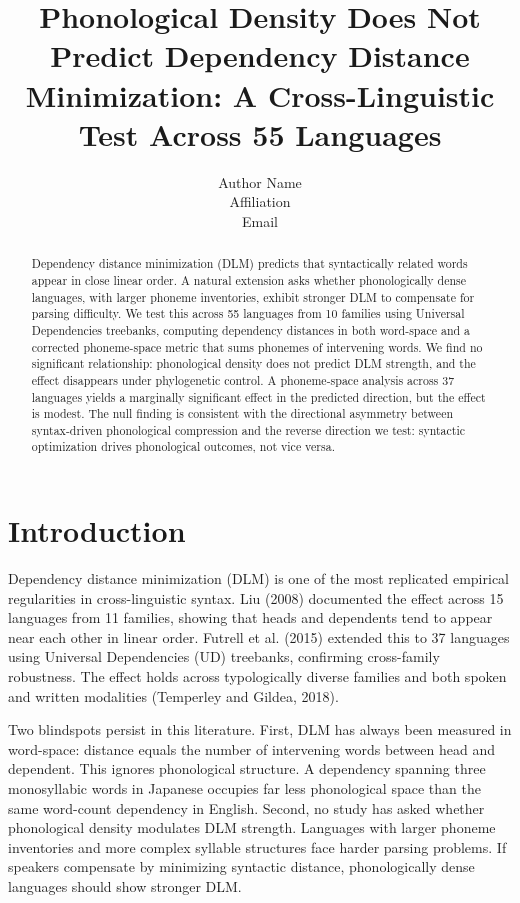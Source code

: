 \documentclass[11pt,letterpaper]{article}
\begin{document}
\title{Phonological Density Does Not Predict Dependency Distance Minimization: A Cross-Linguistic Test Across 55 Languages}

\author{Author Name\\
Affiliation\\
Email}

\maketitle

\begin{abstract}
Dependency distance minimization (DLM) predicts that syntactically related words appear in close linear order. A natural extension asks whether phonologically dense languages, with larger phoneme inventories, exhibit stronger DLM to compensate for parsing difficulty. We test this across 55 languages from 10 families using Universal Dependencies treebanks, computing dependency distances in both word-space and a corrected phoneme-space metric that sums phonemes of intervening words. We find no significant relationship: phonological density does not predict DLM strength, and the effect disappears under phylogenetic control. A phoneme-space analysis across 37 languages yields a marginally significant effect in the predicted direction, but the effect is modest. The null finding is consistent with the directional asymmetry between syntax-driven phonological compression and the reverse direction we test: syntactic optimization drives phonological outcomes, not vice versa.
\end{abstract}

\section{Introduction}

Dependency distance minimization (DLM) is one of the most replicated empirical regularities in cross-linguistic syntax. Liu (2008) documented the effect across 15 languages from 11 families, showing that heads and dependents tend to appear near each other in linear order. Futrell et al. (2015) extended this to 37 languages using Universal Dependencies (UD) treebanks, confirming cross-family robustness. The effect holds across typologically diverse families and both spoken and written modalities (Temperley and Gildea, 2018).

Two blindspots persist in this literature. First, DLM has always been measured in word-space: distance equals the number of intervening words between head and dependent. This ignores phonological structure. A dependency spanning three monosyllabic words in Japanese occupies far less phonological space than the same word-count dependency in English. Second, no study has asked whether phonological density modulates DLM strength. Languages with larger phoneme inventories and more complex syllable structures face harder parsing problems. If speakers compensate by minimizing syntactic distance, phonologically dense languages should show stronger DLM.
\end{document}

